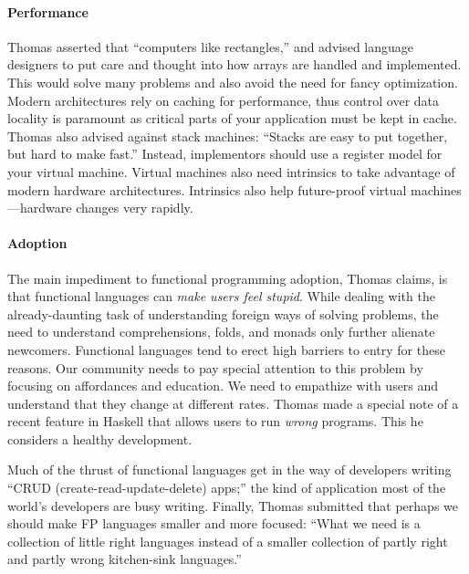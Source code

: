 \documentclass{jfp1}
\begin{document}
\paragraph{Performance} Thomas asserted that ``computers like
rectangles,'' and advised language designers to put care and
thought into how arrays are handled and implemented. This would solve
many problems and also avoid the need for fancy optimization. Modern
architectures rely on caching for performance, thus control over data
locality is paramount as critical parts of your application must be
kept in cache. Thomas also advised against stack machines: ``Stacks
are easy to put together, but hard to make fast.'' Instead,
implementors should use
a register model for your virtual machine. Virtual machines also
need intrinsics to take advantage of modern hardware architectures.
Intrinsics also help future-proof virtual machines---hardware changes
very rapidly.


\paragraph{Adoption} The main impediment to functional programming
adoption, Thomas claims, is that functional languages can \textit{make
users feel stupid}. While dealing with the already-daunting task of
understanding foreign ways of solving problems, the need to understand
comprehensions, folds, and monads only further alienate newcomers.
Functional languages tend to erect high barriers to entry for these
reasons. Our community needs to pay special attention to this problem
by focusing on affordances and education. We need to empathize with
users and understand that they change at different rates. Thomas made
a special note of a recent feature in Haskell that allows users to run
\textit{wrong} programs. This he considers a healthy development.

Much of the thrust of functional languages get in the way of
developers writing ``CRUD (create-read-update-delete) apps;'' the kind
of application most of the world's developers are busy writing. Finally, Thomas
submitted that perhaps we should make FP languages smaller and more
focused: ``What we need is a collection of little right languages
instead of a smaller collection of partly right and partly wrong
kitchen-sink languages.''
\end{document}
